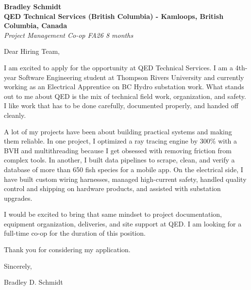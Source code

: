 \documentclass[11pt]{article}
\begin{document}
\textbf{Bradley Schmidt}\\
\vspace{0.5em}
\textbf{QED Technical Services (British Columbia) - Kamloops, British Columbia, Canada}\\
\textit{Project Management Co-op FA26 8 months}

Dear Hiring Team,

\par

I am excited to apply for the opportunity at QED Technical Services. I am a 4th-year Software Engineering student at Thompson Rivers University and currently working as an Electrical Apprentice on BC Hydro substation work. What stands out to me about QED is the mix of technical field work, organization, and safety. I like work that has to be done carefully, documented properly, and handed off cleanly.

\par

A lot of my projects have been about building practical systems and making them reliable. In one project, I optimized a ray tracing engine by 300\% with a BVH and multithreading because I get obsessed with removing friction from complex tools. In another, I built data pipelines to scrape, clean, and verify a database of more than 650 fish species for a mobile app. On the electrical side, I have built custom wiring harnesses, managed high-current safety, handled quality control and shipping on hardware products, and assisted with substation upgrades.

\par

I would be excited to bring that same mindset to project documentation, equipment organization, deliveries, and site support at QED. I am looking for a full-time co-op for the duration of this position.

\par

Thank you for considering my application.

\par

Sincerely,

\par

Bradley D. Schmidt
\end{document}

